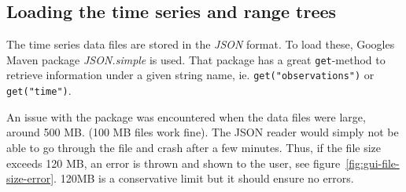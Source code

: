 \subsection{Loading the time series and range trees} \label{sec:loading-time-series}

The time series data files are stored in the \textit{JSON} format. To load
these, Googles Maven package \textit{JSON.simple} is used. That package has a
great \texttt{get}-method to retrieve information under a given string name, ie.
\texttt{get("observations")} or \texttt{get("time")}. 

An issue with the package was encountered when the data files were large, around
500 MB. (100 MB files work fine). The JSON reader would simply not be able to go
through the file and crash after a few minutes. Thus, if the file size exceeds
120 MB, an error is thrown and shown to the user,
see figure~\ref{fig:gui-file-size-error}. 120MB is a conservative limit but
it should ensure no errors. 

